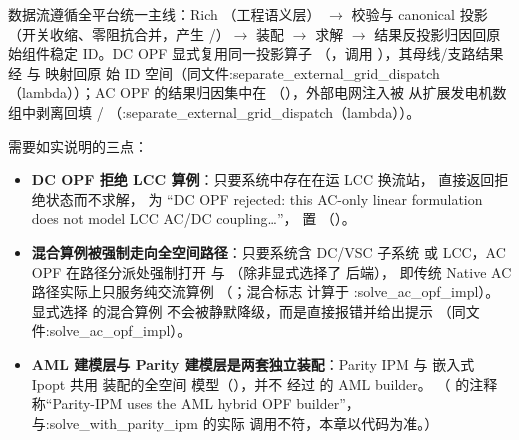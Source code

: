数据流遵循全平台统一主线：Rich （工程语义层）
$\rightarrow$ 校验与 canonical 投影（开关收缩、零阻抗合并，产生
/）$\rightarrow$ 装配 
$\rightarrow$ 求解 $\rightarrow$ 结果反投影归因回原始组件稳定 ID。DC OPF
显式复用同一投影算子
（，调用
），其母线/支路结果经
 与  映射回原
始 ID 空间（同文件:separate\_external\_grid\_dispatch（lambda））；AC OPF 的结果归因集中在
（），外部电网注入被
从扩展发电机数组中剥离回填 /
（:separate\_external\_grid\_dispatch（lambda））。

需要如实说明的三点：

\begin{itemize}
  \item \textbf{DC OPF 拒绝 LCC 算例}：只要系统中存在在运 LCC 换流站，
         直接返回拒绝状态而不求解， 为
        ``DC OPF rejected: this AC-only linear formulation does not model
        LCC AC/DC coupling\ldots''， 置
        （）。
  \item \textbf{混合算例被强制走向全空间路径}：只要系统含 DC/VSC 子系统
        或 LCC，AC OPF 在路径分派处强制打开  与
        （除非显式选择了  后端），
        即传统 Native AC 路径实际上只服务纯交流算例
        （；混合标志
        计算于 :solve\_ac\_opf\_impl）。显式选择  的混合算例
        不会被静默降级，而是直接报错并给出提示
        （同文件:solve\_ac\_opf\_impl）。
  \item \textbf{AML 建模层与 Parity 建模层是两套独立装配}：Parity IPM 与
        嵌入式 Ipopt 共用  装配的全空间
        模型（），并不
        经过  的 AML builder。
        （ 的注释
        称“Parity-IPM uses the AML hybrid OPF builder”，与:solve\_with\_parity\_ipm 的实际
        调用不符，本章以代码为准。）
\end{itemize}

